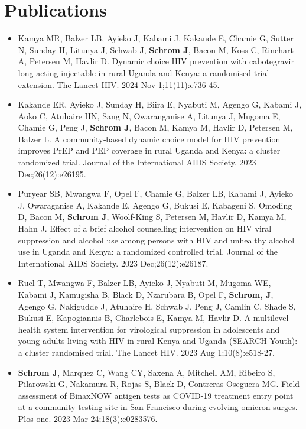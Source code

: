 \documentclass[11pt]{article}
\begin{document}
\section{Publications}
\begin{itemize}
    \setlength{\itemsep}{1em}
    \renewcommand{\labelitemi}{}
    \setlength{\leftskip}{-1.5em}
    \item Kamya MR, Balzer LB, Ayieko J, Kabami J, Kakande E, Chamie G, Sutter N, Sunday H, Litunya J, Schwab J, \textbf{Schrom J}, Bacon M, Koss C, Rinehart A, Petersen M, Havlir D. Dynamic choice HIV prevention with cabotegravir long-acting injectable in rural Uganda and Kenya: a randomised trial extension. The Lancet HIV. 2024 Nov 1;11(11):e736-45.
    \item Kakande ER, Ayieko J, Sunday H, Biira E, Nyabuti M, Agengo G, Kabami J, Aoko C, Atuhaire HN, Sang N, Owaranganise A, Litunya J, Mugoma E, Chamie G, Peng J, \textbf{Schrom J}, Bacon M, Kamya M, Havlir D, Petersen M, Balzer L. A community‐based dynamic choice model for HIV prevention improves PrEP and PEP coverage in rural Uganda and Kenya: a cluster randomized trial. Journal of the International AIDS Society. 2023 Dec;26(12):e26195.
    \item Puryear SB, Mwangwa F, Opel F, Chamie G, Balzer LB, Kabami J, Ayieko J, Owaraganise A, Kakande E, Agengo G, Bukusi E, Kabageni S, Omoding D, Bacon M, \textbf{Schrom J}, Woolf-King S, Petersen M, Havlir D, Kamya M, Hahn J. Effect of a brief alcohol counselling intervention on HIV viral suppression and alcohol use among persons with HIV and unhealthy alcohol use in Uganda and Kenya: a randomized controlled trial. Journal of the International AIDS Society. 2023 Dec;26(12):e26187.
    \item Ruel T, Mwangwa F, Balzer LB, Ayieko J, Nyabuti M, Mugoma WE, Kabami J, Kamugisha B, Black D, Nzarubara B, Opel F, \textbf{Schrom, J}, Agengo G, Nakigudde J, Atuhaire H, Schwab J, Peng J, Camlin C, Shade S, Bukusi E, Kapogiannis B, Charlebois E, Kamya M, Havlir D. A multilevel health system intervention for virological suppression in adolescents and young adults living with HIV in rural Kenya and Uganda (SEARCH-Youth): a cluster randomised trial. The Lancet HIV. 2023 Aug 1;10(8):e518-27.
    \item \textbf{Schrom J}, Marquez C, Wang CY, Saxena A, Mitchell AM, Ribeiro S, Pilarowski G, Nakamura R, Rojas S, Black D, Contreras Oseguera MG. Field assessment of BinaxNOW antigen tests as COVID-19 treatment entry point at a community testing site in San Francisco during evolving omicron surges. Plos one. 2023 Mar 24;18(3):e0283576.

\end{itemize}
\end{document}
